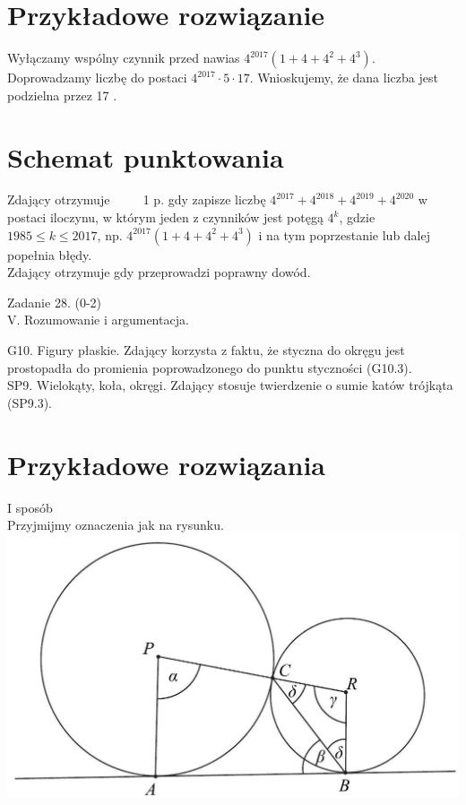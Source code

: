 \documentclass[10pt]{article}
\begin{document}
\section*{Przykładowe rozwiązanie}
Wyłączamy wspólny czynnik przed nawias $4^{2017}\left(1+4+4^{2}+4^{3}\right)$. Doprowadzamy liczbę do postaci $4^{2017} \cdot 5 \cdot 17$. Wnioskujemy, że dana liczba jest podzielna przez 17 .

\section*{Schemat punktowania}
Zdający otrzymuje $\qquad$ 1 p. gdy zapisze liczbę $4^{2017}+4^{2018}+4^{2019}+4^{2020}$ w postaci iloczynu, w którym jeden z czynników jest potęgą $4^{k}$, gdzie $1985 \leq k \leq 2017$, np. $4^{2017}\left(1+4+4^{2}+4^{3}\right)$ i na tym poprzestanie lub dalej popełnia błędy.\\
Zdający otrzymuje gdy przeprowadzi poprawny dowód.

Zadanie 28. (0-2)\\
V. Rozumowanie i argumentacja.

\begin{displayquote}
G10. Figury płaskie. Zdający korzysta z faktu, że styczna do okręgu jest prostopadła do promienia poprowadzonego do punktu styczności (G10.3).\\
SP9. Wielokąty, koła, okręgi. Zdający stosuje twierdzenie o sumie katów trójkąta (SP9.3).
\end{displayquote}

\section*{Przykładowe rozwiązania}
I sposób\\
Przyjmijmy oznaczenia jak na rysunku.\\
\includegraphics[max width=\textwidth, center]{2025_02_07_e35f706dbfcfb4be75cfg-08}
\end{document}

